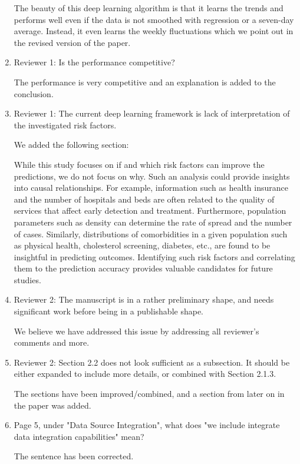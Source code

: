 \documentclass{article}
\begin{document}
\begin{enumerate}
    The beauty of this deep learning algorithm is that it learns the trends and performs well even if the data is not smoothed with regression or a seven-day average. Instead, it even learns the weekly fluctuations which we point out in the revised version of the paper.

\item Reviewer 1: Is the performance competitive? 

    The performance is very competitive and an explanation is added to the conclusion. 

\item Reviewer 1: The current deep learning framework is lack of interpretation of the investigated risk factors.

    We added the following section:

While this study focuses on if and which risk factors can improve the predictions, we do not focus on why. Such an analysis could provide insights into causal relationships. For example,  information such as health insurance and the number of hospitals and beds are often related to the quality of services that affect early detection and treatment. Furthermore, population parameters such as density can determine the rate of spread and the number of cases. Similarly, distributions of comorbidities in a given population such as physical health, cholesterol screening, diabetes, etc., are found to be insightful in predicting outcomes. Identifying such risk factors and correlating them to the prediction accuracy provides valuable candidates for future studies.

\item Reviewer 2: The manuscript is in a rather preliminary shape, and needs significant work before being in a publishable shape.  

    We believe we have addressed this issue by addressing all reviewer's comments and more.

\item Reviewer 2: Section 2.2 does not look sufficient as a subsection.  It should be either expanded to include more details, or combined with Section 2.1.3.  

    The sections have been improved/combined, and a section from later on in the paper was added.

\item Page 5, under "Data Source Integration", what does "we include integrate data integration capabilities" mean?

    The sentence has been corrected.


\end{enumerate}
\end{document}
